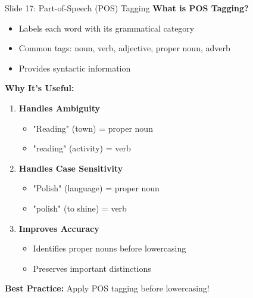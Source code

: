 \documentclass[8pt]{beamer}
\begin{document}
	\begin{frame}{Slide 17: Part-of-Speech (POS) Tagging}
		\fontsize{6.5}{7.5}\selectfont
		\textbf{What is POS Tagging?}
		\begin{itemize}
			\item Labels each word with its grammatical category
			\item Common tags: noun, verb, adjective, proper noun, adverb
			\item Provides syntactic information
		\end{itemize}
		
		\vspace{0.1cm}
		\textbf{Why It's Useful:}
		\begin{enumerate}
			\item \textbf{Handles Ambiguity}
			\begin{itemize}
				\item "Reading" (town) = proper noun
				\item "reading" (activity) = verb
			\end{itemize}
			\item \textbf{Handles Case Sensitivity}
			\begin{itemize}
				\item "Polish" (language) = proper noun
				\item "polish" (to shine) = verb
			\end{itemize}
			\item \textbf{Improves Accuracy}
			\begin{itemize}
				\item Identifies proper nouns before lowercasing
				\item Preserves important distinctions
			\end{itemize}
		\end{enumerate}
		
		\textcolor{myblue}{\textbf{Best Practice:}} Apply POS tagging before lowercasing!
	\end{frame}
	
\end{document}
